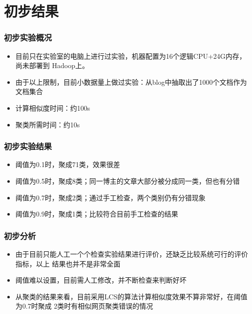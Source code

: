 \documentclass[11pt,presentation]{beamer}
\begin{document}
\section{初步结果}
\label{sec-3}
\begin{frame}
\frametitle{初步实验概况}
\label{sec-3-1}

\begin{itemize}
\item 目前只在实验室的电脑上进行过实验，机器配置为16个逻辑CPU+24G内存，尚未部署到
  Hadoop上。
\item 由于以上限制，目前小数据量上做过实验：从blog中抽取出了1000个文档作为文档集合
\item 计算相似度时间：约100s
\item 聚类所需时间：约10s
\end{itemize}
\end{frame}
\begin{frame}
\frametitle{初步实验结果}
\label{sec-3-2}

\begin{itemize}
\item 阈值为0.1时，聚成71类，效果很差
\item 阈值为0.5时，聚成8类；同一博主的文章大部分被分成同一类，但也有分错
\item 阈值为0.7时，聚成2类；通过手工检查，两个类别仍有分错现象
\item 阈值为0.9时，聚成1类；比较符合目前手工检查的结果
\end{itemize}
\end{frame}
\begin{frame}
\frametitle{初步分析}
\label{sec-3-3}

\begin{itemize}
\item 由于目前只能人工一个个检查实验结果进行评价，还缺乏比较系统可行的评价指标，以上
  结果也并不是非常全面
\item 阈值难以设置，目前需人工修改，并不断检查来判断好坏
\item 从聚类的结果来看，目前采用LCS的算法计算相似度效果不算非常好，在阈值为0.7时聚成
  2类时有相似网页聚类错误的情况
\end{itemize}
\end{frame}
\end{document}
